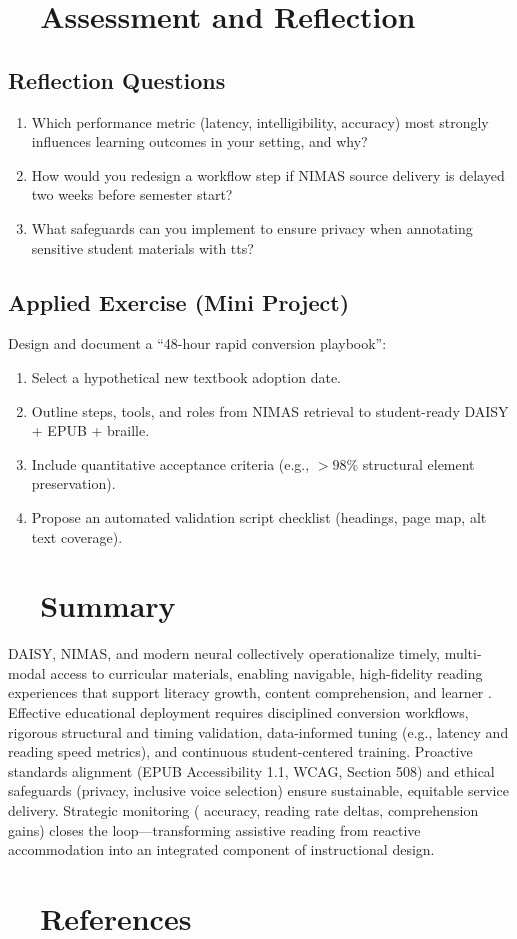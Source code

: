 \section{~~Assessment and Reflection}\label{ch07:sec:assessment-reflection}
\subsection*{Reflection Questions}
\begin{enumerate}
	\item Which performance metric (latency, intelligibility,  accuracy) most strongly influences learning
	      outcomes in your setting, and why?
	\item How would you redesign a workflow step if NIMAS source delivery is delayed two weeks before semester start?
	\item What safeguards can you implement to ensure privacy when annotating sensitive student materials with \gls{tts}?
\end{enumerate}

\subsection*{Applied Exercise (Mini Project)}
Design and document a “48-hour rapid conversion playbook”:
\begin{enumerate}
	\item Select a hypothetical new textbook adoption date.
	\item Outline steps, tools, and roles from NIMAS retrieval to student-ready DAISY + EPUB + braille.
	\item Include quantitative acceptance criteria (e.g., $> 98\%$ structural element preservation).
	\item Propose an automated validation script checklist (headings, page map, alt text coverage).
\end{enumerate}

\section{~~Summary}\label{ch07:sec:summary}
DAISY, NIMAS, and modern neural  collectively operationalize timely, multi-modal access
to curricular materials, enabling navigable, high-fidelity reading experiences that support literacy growth,
content comprehension, and learner . Effective educational deployment requires disciplined
conversion workflows, rigorous structural and timing validation, data-informed tuning (e.g., latency and
reading speed metrics), and continuous student-centered training. Proactive standards alignment (EPUB
Accessibility 1.1, WCAG, Section 508) and ethical safeguards (privacy, inclusive voice selection) ensure
sustainable, equitable service delivery. Strategic monitoring ( accuracy, reading rate deltas,
comprehension gains) closes the loop—transforming assistive reading from reactive accommodation into
an integrated component of instructional design.

\section{~~References}\label{ch07:sec:references}

\endinput

